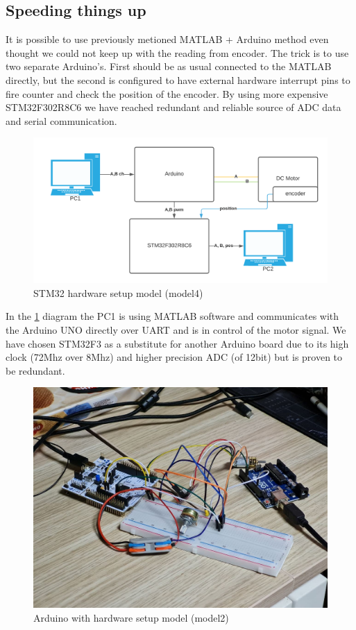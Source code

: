 \documentclass[]{final_report}
\begin{document}
\subsection{Speeding things up}

It is possible to use previously metioned MATLAB + Arduino method even thought we could not keep up with the reading from encoder. The trick is to use two separate Arduino's. First should be as usual connected to the MATLAB directly, but the second is configured to have external hardware interrupt pins to fire counter and check the position of the encoder. By using more expensive STM32F302R8C6 we have reached redundant and reliable source of ADC data and serial communication. 

\begin{figure} [h!]
\centerline{\includegraphics[width=.95\textwidth]{Screenshots for paper/STM32/Blank diagram.png}}
\caption{STM32 hardware setup model (model4)}
\label{fig:stm32f3_m1}
\end{figure}

In the \ref{fig:stm32f3_m1} diagram the PC1 is using MATLAB software and communicates with the Arduino UNO directly over UART and is in control of the motor signal. We have chosen STM32F3 as a substitute for another Arduino board due to its high clock (72Mhz over 8Mhz) and higher precision ADC (of 12bit) but is proven to be redundant. 

\begin{figure} [h!]
\centerline{\includegraphics[width=.75\textwidth]{Screenshots for paper/arduino/model 2/setup2.jpg}}
\caption{Arduino with hardware setup model (model2)}
\label{fig:arduinoMotorSetupDiag2}
\end{figure}
\end{document}
